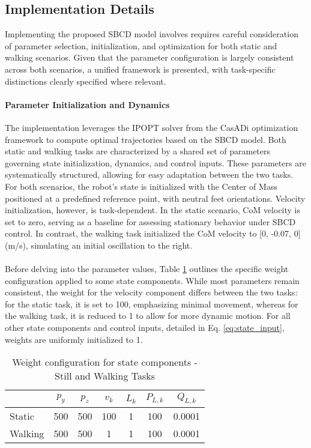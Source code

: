 \documentclass[main.tex]{subfiles}
\begin{document}
\begin{sloppypar}
\subsection{Implementation Details}
Implementing the proposed SBCD model involves requires careful consideration of parameter selection, initialization, and optimization for both static and walking scenarios. Given that the parameter configuration is largely consistent across both scenarios, a unified framework is presented, with task-specific distinctions clearly specified where relevant.
\paragraph{Parameter Initialization and Dynamics} The implementation leverages the IPOPT solver from the CasADi optimization framework to compute optimal trajectories based on the SBCD model. Both static and walking tasks are characterized by a shared set of parameters governing state initialization, dynamics, and control inputs. These parameters are systematically structured, allowing for easy adaptation between the two tasks. For both scenarios, the robot’s state is initialized with the Center of Mass positioned at a predefined reference point, with neutral feet orientations. Velocity initialization, however, is task-dependent. In the static scenario, CoM velocity is set to zero, serving as a baseline for assessing stationary behavior under SBCD control. In contrast, the walking task initialized the CoM velocity to [0, -0.07, 0]  (m/s), simulating an initial oscillation to the right. \\ 
\\
Before delving into the parameter values, Table \ref{tab:weight_states} outlines the specific weight configuration applied to some state components. While most parameters remain consistent, the weight for the velocity component differs between the two tasks: for the static task, it is set to 100, emphasizing minimal movement, whereas for the walking task, it is reduced to 1 to allow for more dynamic motion. For all other state components and control inputs, detailed in Eq. \eqref{eq:state_input}, weights are uniformly initialized to 1.
\begin{table}[h!]
    \centering
    \begin{tabular}{lcccccc}
    \toprule
    & $p_y$ & $p_z$ & $v_k$ & $L_k$ & $P_{L,k}$ & $Q_{L,k}$ \\
    \midrule
    Static & 500 & 500 & 100 & 1 & 100 & 0.0001 \\
    Walking & 500 & 500 & 1 & 1 & 100 & 0.0001 \\
    \bottomrule
    \end{tabular}
    \caption{Weight configuration for state components - Still and Walking Tasks}
    \label{tab:weight_states}
\end{table}

\end{sloppypar}
\end{document}
